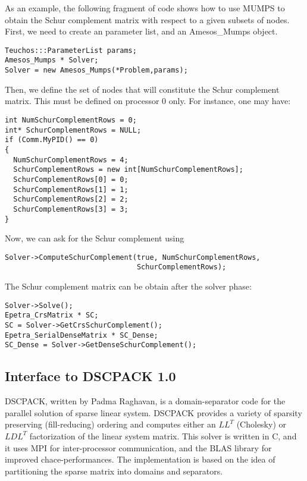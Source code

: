 \documentclass[11pt]{SANDreport}
\begin{document}
As an example, the following fragment of code shows how to use MUMPS to
obtain the Schur complement matrix with respect to a given subsets of
nodes.  First, we need to create an parameter list, and an Amesos\_Mumps
object.
\begin{verbatim}
Teuchos:::ParameterList params;
Amesos_Mumps * Solver;
Solver = new Amesos_Mumps(*Problem,params);
\end{verbatim}
Then, we define the set of nodes that will constitute the Schur
complement matrix. This must be defined on processor 0 only. For
instance, one may have:
\begin{verbatim}
int NumSchurComplementRows = 0;
int* SchurComplementRows = NULL;
if (Comm.MyPID() == 0) 
{
  NumSchurComplementRows = 4;
  SchurComplementRows = new int[NumSchurComplementRows];
  SchurComplementRows[0] = 0;
  SchurComplementRows[1] = 1; 
  SchurComplementRows[2] = 2;
  SchurComplementRows[3] = 3;
}
\end{verbatim}
Now, we can ask for the Schur complement using
\begin{verbatim}  
Solver->ComputeSchurComplement(true, NumSchurComplementRows,
                               SchurComplementRows);
\end{verbatim}
The Schur complement matrix can be obtain after the solver phase:  
\begin{verbatim}  
Solver->Solve();
Epetra_CrsMatrix * SC;
SC = Solver->GetCrsSchurComplement();
Epetra_SerialDenseMatrix * SC_Dense;
SC_Dense = Solver->GetDenseSchurComplement();
\end{verbatim}

\subsection{Interface to DSCPACK 1.0}
\label{sec:dscpack}

DSCPACK, written by  Padma Raghavan, is a domain-separator code for the
parallel solution of sparse linear system.
DSCPACK provides a variety of sparsity preserving (fill-reducing) ordering and
computes either an $LL^T$ (Cholesky) or $LDL^T$ factorization of the linear
system matrix. This solver is written in C, and it uses MPI for
inter-processor communication, and the BLAS library for improved
chace-performances. The implementation is based on the idea of partitioning
the sparse matrix into domains and separators. 
\end{document}
